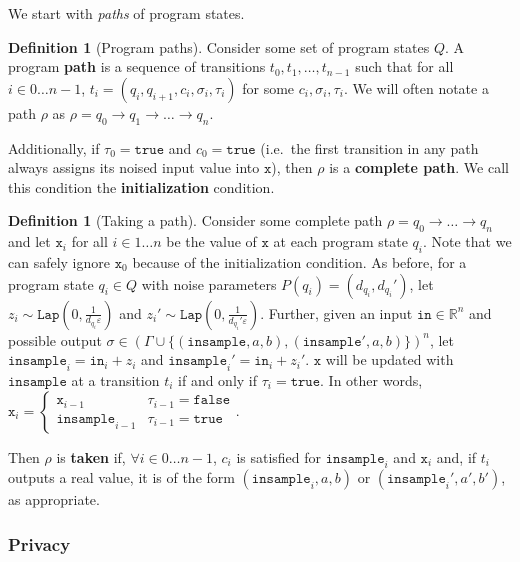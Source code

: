 \documentclass[12pt]{article}
\newcommand{\RR}{\mathbb{R}}
\newcommand{\Lap}{\texttt{Lap}}
\theoremstyle{definition}
\newtheorem{defn}[thm]{Definition}
\begin{document}
We start with \textit{paths} of program states. 

\begin{defn}[Program paths]
    Consider some set of program states $Q$. A program \textbf{path} is a sequence of transitions $t_0, t_1, \ldots, t_{n-1}$ such that for all $i\in 0\ldots n-1$, $t_i = (q_i, q_{i+1}, c_i, \sigma_i, \tau_i)$ for some $c_i, \sigma_i, \tau_i$. We will often notate a path $\rho$ as $\rho = q_0\to q_1\to \ldots \to q_n$. 
    
    Additionally, if $\tau_0 = \texttt{true}$ and $c_0 = \texttt{true}$ (i.e.\ the first transition in any path always assigns its noised input value into $\texttt{x}$), then $\rho$ is a \textbf{complete path}. We call this condition the \textbf{initialization} condition.
\end{defn}
\begin{defn}[Taking a path]
    Consider some complete path $\rho = q_0\to \ldots \to q_n$ and let $\texttt{x}_i$ for all $i\in 1\ldots n$ be the value of $\texttt{x}$ at each program state $q_i$. Note that we can safely ignore $\texttt{x}_0$ because of the initialization condition. As before, for a program state $q_i\in Q$ with noise parameters $P({q_i}) = (d_{q_i}, d_{q_i}')$, let $z_i\sim \Lap(0, \frac{1}{d_{q_i}\varepsilon})$ and $z_i'\sim\Lap(0, \frac{1}{d_{q_i}'\varepsilon})$. 
    Further, given an input $\texttt{in}\in \RR^n$ and possible output $\sigma \in (\Gamma\cup\{(\texttt{insample}, a, b), (\texttt{insample}', a, b)\})^n$, let $\texttt{insample}_i = \texttt{in}_i+z_i$ and $\texttt{insample}_i' = \texttt{in}_i+z_i'$. $\texttt{x}$ will be updated with $\texttt{insample}$ at a transition $t_i$ if and only if $\tau_i = \texttt{true}$. In other words, $\texttt{x}_i = \begin{cases}
        \texttt{x}_{i-1} & \tau_{i-1} =\texttt{false}\\
        \texttt{insample}_{i-1} &\tau_{i-1}=\texttt{true}
    \end{cases}$. 

    Then $\rho$ is \textbf{taken} if, $\forall i\in 0\ldots n-1$, $c_i$ is satisfied for $\texttt{insample}_i$ and $\texttt{x}_i$ and, if $t_i$ outputs a real value, it is of the form $(\texttt{insample}_i, a, b)$ or $(\texttt{insample}_i', a', b')$, as appropriate. 
\end{defn}

\subsubsection{Privacy}
\end{document}
